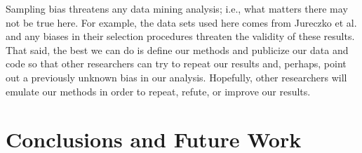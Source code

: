 \documentclass[sigconf, proceedings, 9pt]{acmart}
\begin{document}
Sampling bias threatens any data mining analysis; i.e., what matters
there may not be true here. For example, the data sets used here comes 
from 
Jureczko et al. and any biases in their selection procedures
threaten the validity of these results.
That said,
the best we can do is define our methods and publicize our data and code so 
that other researchers can
try to repeat our results and, perhaps, point out a previously unknown bias
in our analysis. Hopefully, other researchers will emulate our methods in
order to repeat, refute, or improve our results.


\section{Conclusions and Future Work}
\label{sect:conclusion}


\balance


\end{document}
